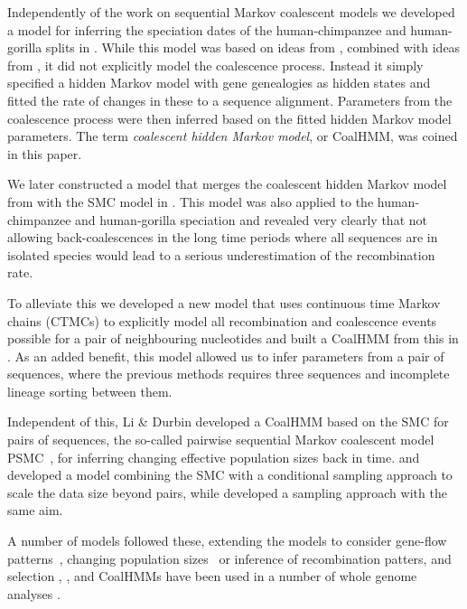 \documentclass[graybox]{svmult}
\begin{document}
Independently of the work on sequential Markov coalescent models we developed a model for inferring the speciation dates of the human-chimpanzee and human-gorilla splits in \citet{Hobolth:2007gza}. While this model was based on ideas from \citet{Wiuf:1999gua}, combined with ideas from \citet{Takahata:1995kl}, it did not explicitly model the coalescence process. Instead it simply specified a hidden Markov model with gene genealogies as hidden states and fitted the rate of changes in these to a sequence alignment. Parameters from the coalescence process were then inferred based on the fitted hidden Markov model parameters. The term \emph{coalescent hidden Markov model}, or CoalHMM, was coined in this paper.

We later constructed a model that merges the coalescent hidden Markov model from \citet{Hobolth:2007gza} with the SMC model in \citet{Dutheil:2009dta}. This model was also applied to the human-chimpanzee and human-gorilla speciation and revealed very clearly that not allowing back-coalescences in the long time periods where all sequences are in isolated species would lead to a serious underestimation of the recombination rate.

To alleviate this we developed a new model that uses continuous time Markov chains (CTMCs) to explicitly model all recombination and coalescence events possible for a pair of neighbouring nucleotides and built a CoalHMM from this in \citet{Mailund:2011dva}. As an added benefit, this model allowed us to infer parameters from a pair of sequences, where the previous methods requires three sequences and incomplete lineage sorting between them.

Independent of this, Li \& Durbin developed a CoalHMM based on the SMC for pairs of sequences, the so-called pairwise sequential Markov coalescent model PSMC~\cite{Li:2011eza}, for inferring changing effective population sizes back in time. \citet{Paul:2010iba} and \citet{Paul:2011gva} developed a model combining the SMC with a conditional sampling approach to scale the data size beyond pairs, while \citet{Rasmussen:2014cqa} developed a sampling approach with the same aim.

A number of models followed these, extending the models to consider gene-flow patterns~\cite{Steinrucken:2013kba,Mailund:2012ewa}, changing population sizes~\cite{Sheehan:2013iba,Schiffels:2014cua} or inference of recombination patters, and selection \cite{Munch:2014cba, Munch:2014cwa}, \cite{Dutheil:2015kl, Munch:2016dn}, and CoalHMMs have been used in a number of whole genome analyses \cite{Locke:2011gna, Hobolth:2011dia, Scally:2012ika, Prufer:2012ea, Miller:2012cxa, Abascal:2016cy, PradoMartinez:2013dna, Jonsson:2014fga}.
\end{document}
